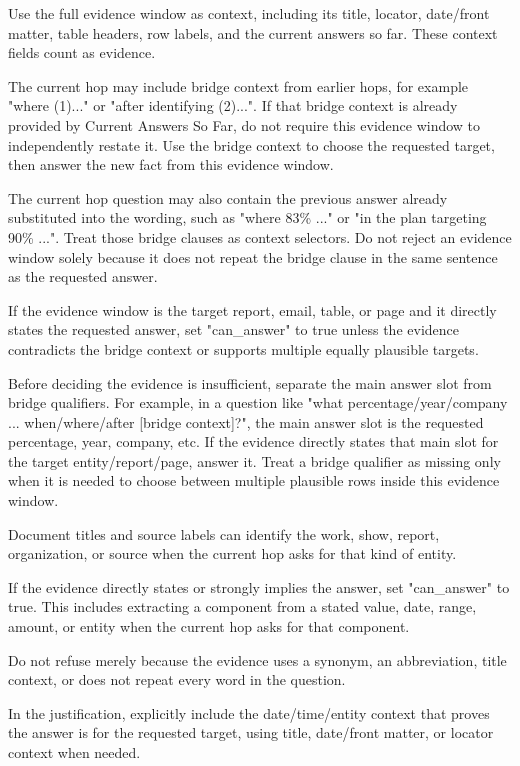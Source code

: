 \begin{tcolorbox}[colback=white, colframe=my-green, coltitle=black, parskip=5mm, title=\textbf{Document Read}, halign=flush left, enhanced, breakable, skin first=enhanced, skin middle=enhanced, skin last=enhanced]
\begin{scriptsize}
Use the full evidence window as context, including its title, locator, date/front matter, table headers, row labels, and the current answers so far. These context fields count as evidence.\par
The current hop may include bridge context from earlier hops, for example "where (1)..." or "after identifying (2)...". If that bridge context is already provided by Current Answers So Far, do not require this evidence window to independently restate it. Use the bridge context to choose the requested target, then answer the new fact from this evidence window.\par
The current hop question may also contain the previous answer already substituted into the wording, such as "where 83\% ..." or "in the plan targeting 90\% ...". Treat those bridge clauses as context selectors. Do not reject an evidence window solely because it does not repeat the bridge clause in the same sentence as the requested answer.\par
If the evidence window is the target report, email, table, or page and it directly states the requested answer, set "can\_answer" to true unless the evidence contradicts the bridge context or supports multiple equally plausible targets.\par
Before deciding the evidence is insufficient, separate the main answer slot from bridge qualifiers. For example, in a question like "what percentage/year/company ... when/where/after [bridge context]?", the main answer slot is the requested percentage, year, company, etc. If the evidence directly states that main slot for the target entity/report/page, answer it. Treat a bridge qualifier as missing only when it is needed to choose between multiple plausible rows inside this evidence window.\par
Document titles and source labels can identify the work, show, report, organization, or source when the current hop asks for that kind of entity.\par
If the evidence directly states or strongly implies the answer, set "can\_answer" to true. This includes extracting a component from a stated value, date, range, amount, or entity when the current hop asks for that component.\par
Do not refuse merely because the evidence uses a synonym, an abbreviation, title context, or does not repeat every word in the question.\par
In the justification, explicitly include the date/time/entity context that proves the answer is for the requested target, using title, date/front matter, or locator context when needed.\par

\end{scriptsize}
\end{tcolorbox}
